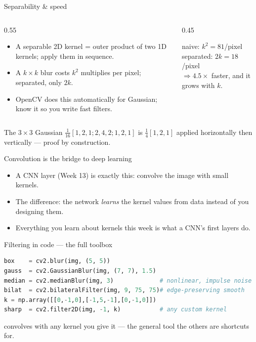 \documentclass[10pt,aspectratio=169]{beamer}
\begin{document}
\begin{frame}{Separability \& speed}
  \begin{columns}[T]
    \begin{column}{0.55\textwidth}
      \begin{itemize}
        \item A separable 2D kernel = outer product of two 1D kernels; apply them in sequence.
        \item A $k\times k$ blur costs $k^2$ multiplies per pixel; separated, only $2k$.
        \item OpenCV does this automatically for Gaussian; know it so you write fast filters.
      \end{itemize}
    \end{column}
    \begin{column}{0.45\textwidth}
      \begin{mathbox}[Cost, $k=9$]
        naive: $k^2 = 81$/pixel\\
        separated: $2k = 18$/pixel\\[2pt]
        $\Rightarrow 4.5\times$ faster, and it grows with $k$.
      \end{mathbox}
    \end{column}
  \end{columns}
  \begin{infobox}
    The $3\times3$ Gaussian $\tfrac{1}{16}[1,2,1;2,4,2;1,2,1]$ is $\tfrac14[1,2,1]$ applied
    horizontally then vertically — proof by construction.
  \end{infobox}
\end{frame}

\begin{frame}{Convolution is the bridge to deep learning}
  \begin{itemize}
    \item A CNN layer (Week 13) is exactly this: convolve the image with small kernels.
    \item The difference: the network \emph{learns} the kernel values from data instead of you designing them.
    \item Everything you learn about kernels this week is what a CNN's first layers do.
  \end{itemize}
\end{frame}

\begin{frame}[fragile]{Filtering in code — the full toolbox}
\begin{lstlisting}[language=Python]
box    = cv2.blur(img, (5, 5))
gauss  = cv2.GaussianBlur(img, (7, 7), 1.5)
median = cv2.medianBlur(img, 3)             # nonlinear, impulse noise
bilat  = cv2.bilateralFilter(img, 9, 75, 75)# edge-preserving smooth
k = np.array([[0,-1,0],[-1,5,-1],[0,-1,0]])
sharp  = cv2.filter2D(img, -1, k)           # any custom kernel
\end{lstlisting}
   convolves with any kernel you give it — the general tool the others are shortcuts for.
\end{frame}
\end{document}

